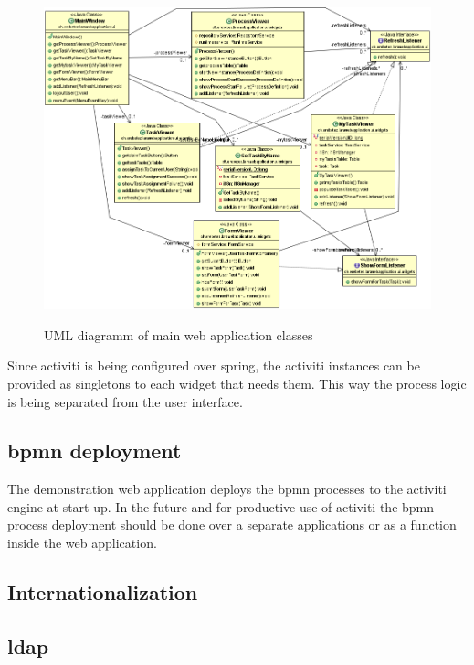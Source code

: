 \documentclass[paper=a4,twoside=false,BCOR=0mm,DIV=calc,fontsize=12pt]{scrartcl}
\begin{document}
\begin{figure}
    \begin{center}
      \includegraphics[width=1\textwidth]{./img/uml_webapp_model.png}\\
    \end{center}
  \caption{UML diagramm of main web application classes}
  \label{webapplicationclassuml}
\end{figure} 

Since activiti is being configured over spring, the activiti instances can be provided as singletons to each widget that needs them. This way the
process logic is being separated from the user interface.




\subsection{bpmn deployment}
The demonstration web application deploys the bpmn processes to the activiti engine at start up. In the future and for productive use of activiti the
bpmn process deployment should be done over a separate applications or as a function inside the web application. 


\subsection{Internationalization}




\subsection{ldap}
\end{document}
